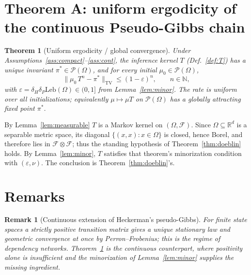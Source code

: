 \documentclass[11pt]{article}
\makeatletter
\theoremstyle{definitionbreak}
\theoremstyle{plainbreak}
\newtheorem{theorem}{Theorem}[section]
\theoremstyle{remarkbreak}
\newtheorem{remark}{Remark}[section]
\renewenvironment{proof}[1][\proofname]{\par
  \pushQED{\qed}\normalfont
  \topsep6\p@\@plus6\p@\relax
  \trivlist
  \item[\hskip\labelsep\itshape #1\@addpunct{.}]\mbox{}\par\nobreak\ignorespaces
}{\popQED\endtrivlist\@endpefalse}
\newcommand{\R}{\mathbb{R}}
\newcommand{\N}{\mathbb{N}}
\newcommand{\cF}{\mathcal{F}}
\newcommand{\cP}{\mathcal{P}}
\newcommand{\Om}{\Omega}
\newcommand{\Leb}{\mathrm{Leb}}
\newcommand{\TV}{\mathrm{TV}}
\newcommand{\norm}[1]{\lVert #1 \rVert}
\makeatother
\begin{document}
\section{Theorem A: uniform ergodicity of the continuous Pseudo-Gibbs chain}
\label{sec:thmA}

\begin{theorem}[Uniform ergodicity / global convergence]
\label{thm:A}
Under Assumptions~\ref{ass:compact}--\ref{ass:cont}, the inference kernel $T$ (Def.~\ref{def:T}) has
a unique invariant $\pi^\ast\in\cP(\Om)$, and for every initial $\mu_0\in\cP(\Om)$,
\[
  \norm{\mu_0\,T^n-\pi^\ast}_\TV\le(1-\varepsilon)^n,\qquad n\in\N,
\]
with $\varepsilon=\delta_H\delta_P\Leb(\Om)\in(0,1]$ from Lemma~\ref{lem:minor}. The rate is uniform
over all initializations; equivalently $\mu\mapsto\mu T$ on $\cP(\Om)$ has a globally attracting
fixed point $\pi^\ast$.
\end{theorem}
\begin{proof}
By Lemma~\ref{lem:measurable} $T$ is a Markov kernel on $(\Om,\cF)$. Since $\Om\subseteq\R^d$ is a
separable metric space, its diagonal $\{(x,x):x\in\Om\}$ is closed, hence Borel, and therefore lies
in $\cF\otimes\cF$; thus the standing hypothesis of Theorem~\ref{thm:doeblin} holds. By
Lemma~\ref{lem:minor}, $T$ satisfies that theorem's minorization condition with $(\varepsilon,\nu)$.
The conclusion is Theorem~\ref{thm:doeblin}'s.
\end{proof}

\section{Remarks}
\label{sec:remarks}

\begin{remark}[Continuous extension of Heckerman's pseudo-Gibbs]
\label{rem:heckerman}
For \emph{finite} state spaces a strictly positive transition matrix gives a unique stationary law
and geometric convergence at once by Perron--Frobenius; this is the regime of dependency networks.
Theorem~\ref{thm:A} is the continuous counterpart, where positivity alone is insufficient and the
minorization of Lemma~\ref{lem:minor} supplies the missing ingredient.
\end{remark}
\end{document}
